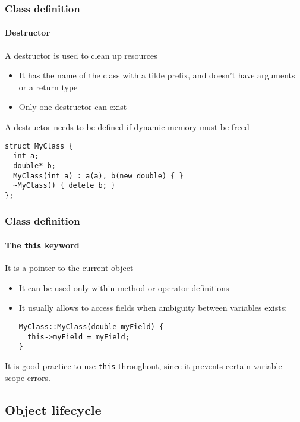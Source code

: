 \begin{frame}[fragile]
\frametitle{Class definition}
\framesubtitle{Destructor}

\begin{block}{A destructor is used to clean up resources}
\begin{itemize}
\item It has the name of the class with a tilde prefix, and doesn't have arguments or a return type
\item Only one destructor can exist
\end{itemize}
\end{block}
\pause
\begin{block}{A destructor needs to be defined if dynamic memory must be freed}
{\scriptsize
\begin{verbatim}
struct MyClass {
  int a;
  double* b;
  MyClass(int a) : a(a), b(new double) { }
  ~MyClass() { delete b; }
};
\end{verbatim}
}
\end{block}

\end{frame}

\begin{frame}[fragile]
\frametitle{Class definition}
\framesubtitle{The \texttt{this} keyword}

\begin{block}{It is a pointer to the current object}
\begin{itemize}
\item It can be used only within method or operator definitions
\item It usually allows to access fields when ambiguity between variables exists:
\begin{verbatim}
MyClass::MyClass(double myField) {
  this->myField = myField;
}
\end{verbatim}
\end{itemize}
It is good practice to use \texttt{this} throughout, since it prevents certain variable scope errors.
\end{block}

\end{frame}

\subsection{Object lifecycle}

